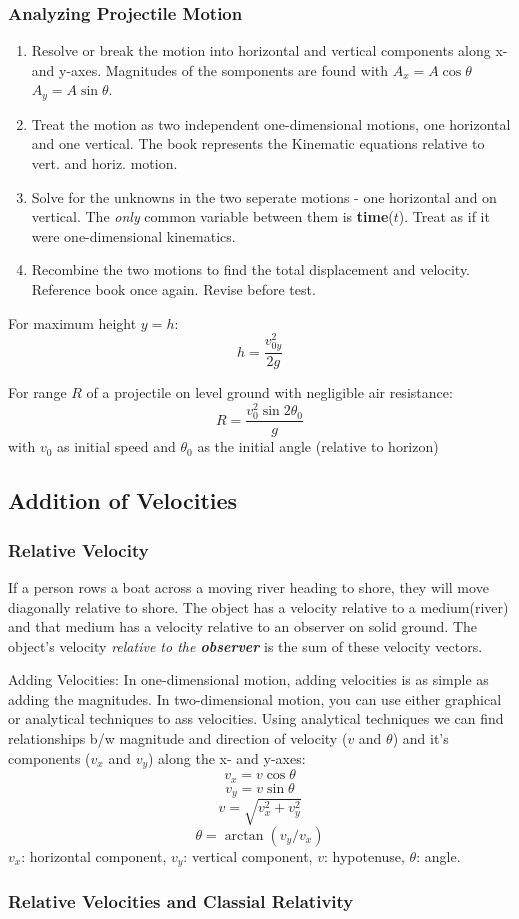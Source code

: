 \documentclass{article}
\begin{document}
\subsubsection{Analyzing Projectile Motion}
\begin{enumerate}
\item Resolve or break the motion into horizontal and vertical components along x- and y-axes. Magnitudes of the somponents are found with $A_x = A\cos \theta$ $A_y = A\sin \theta$.
  
\item Treat the motion as two independent one-dimensional motions, one horizontal and one vertical. The book represents the Kinematic equations relative to vert. and horiz. motion.
  
\item Solve for the unknowns in the two seperate motions - one horizontal and on vertical. The \emph{only} common variable between them is \textbf{time}($t$). Treat as if it were one-dimensional kinematics.
  
\item Recombine the two motions to find the total displacement and velocity. Reference book once again. Revise before test.
\end{enumerate}

For maximum height $y=h$: \[h = \frac{v^2_{0y}}{2g}\]

For range $R$ of a projectile on level ground with negligible air resistance: \[R = \frac{v_0^2 \sin 2 \theta _0}{g}\]
with $v_0$ as initial speed and $\theta _0$ as the initial angle (relative to horizon)

\subsection{Addition of Velocities}
\subsubsection{Relative Velocity}
If a person rows a boat across a moving river heading to shore, they will move diagonally relative to shore. The object has a velocity relative to a medium(river) and that medium has a velocity relative to an observer on solid ground. The object's velocity \emph{relative to the \textbf{observer}} is the sum of these velocity vectors.

Adding Velocities:
In one-dimensional motion, adding velocities is as simple as adding the magnitudes.
In two-dimensional motion, you can use either graphical or analytical techniques to ass velocities.
Using analytical techniques we can find relationships b/w magnitude and direction of velocity ($v$ and $\theta$) and it's components ($v_x$ and $v_y$) along the x- and y-axes:
\[ v_x = v \cos \theta\] \[v_y = v \sin \theta\] \[ v = \sqrt{v_x^2 + v_y^2} \] \[\theta = \arctan (v_y / v_x) \]
$v_x$: horizontal component, $v_y$: vertical component, $v$: hypotenuse, $\theta$: angle.

\subsubsection{Relative Velocities and Classial Relativity}
\end{document}
